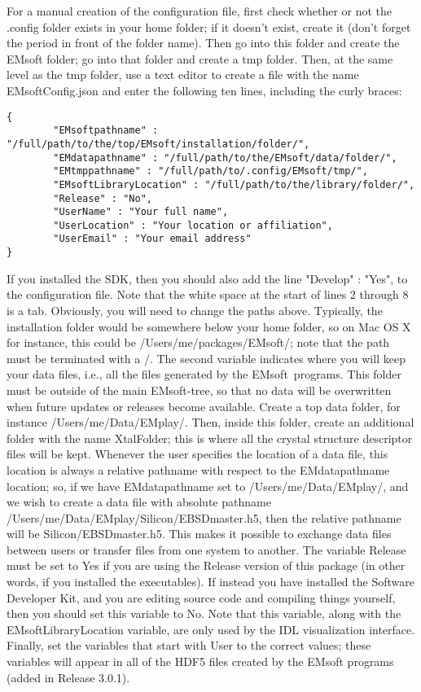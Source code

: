 \documentclass[DIV=calc, paper=letter, fontsize=11pt]{scrartcl}	 %
\newcommand{\ctp}{\textsf{EMsoft}}
\begin{document}
\begin{enumerate}
For a manual creation of the configuration file, first check whether or not the \textsf{.config} folder exists in your home folder; if it doesn't exist, create it (don't forget the 
period in front of the folder name). Then go into this folder and create the \textsf{EMsoft} folder; go into
that folder and create a \textsf{tmp} folder.  Then, at the same level as the tmp folder, use a text editor to
create a file with the name \textsf{EMsoftConfig.json} and enter the following ten lines, including the curly braces:
\begin{verbatim}
{
        "EMsoftpathname" : "/full/path/to/the/top/EMsoft/installation/folder/",
        "EMdatapathname" : "/full/path/to/the/EMsoft/data/folder/",
        "EMtmppathname" : "/full/path/to/.config/EMsoft/tmp/",
        "EMsoftLibraryLocation" : "/full/path/to/the/library/folder/",
        "Release" : "No",
        "UserName" : "Your full name",
        "UserLocation" : "Your location or affiliation",
        "UserEmail" : "Your email address"
}
\end{verbatim}
If you installed the SDK, then you should also add the line \textrm{"Develop" : "Yes",} to the configuration file.
Note that the white space at the start of lines 2 through 8 is a tab.  Obviously, you will need to change the paths above.
Typically, the installation folder would be somewhere below your home folder, so on Mac OS X for instance, this 
could be \textsf{/Users/me/packages/EMsoft/};  note that the path must be terminated with a \textsf{/}.
The second variable indicates where you will keep your data files, i.e., all the files generated by the \ctp\ programs.
This folder must be outside of the main \ctp-tree, so that no data will be overwritten when future updates or releases
become available.  Create a top data folder, for instance \textsf{/Users/me/Data/EMplay/}.  Then, inside this folder,
create an additional folder with the name \textsf{XtalFolder}; this is where all the crystal structure descriptor files 
will be kept.  Whenever the user specifies the location of a data file, this location is always a relative pathname
with respect to the \textsf{EMdatapathname} location;  so, if we have \textsf{EMdatapathname} set to \textsf{/Users/me/Data/EMplay/},
and we wish to create a data file with absolute pathname \textsf{/Users/me/Data/EMplay/Silicon/EBSDmaster.h5}, then
the relative pathname will be \textsf{Silicon/EBSDmaster.h5}.  This makes it possible to exchange data files 
between users or transfer files from one system to another.  The variable \textsf{Release} must be set to \textsf{Yes} if you are 
using the Release version of this package (in other words, if you installed the executables).  If instead you have installed the 
Software Developer Kit, and you are editing source code and compiling things yourself, then you should set this variable to \textsf{No}.  Note that this variable,
along with the \textsf{EMsoftLibraryLocation} variable,  are only used by the IDL visualization interface.  
Finally, set the variables that start with \textsf{User} to the correct values; these 
variables will appear in all of the HDF5 files created by the \textsf{EMsoft} programs (added in Release 3.0.1).


\end{enumerate}
\end{document}
